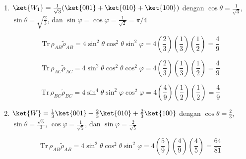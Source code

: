 \begin{enumerate}
	sehingga $\det c_{1BC}^0 = 0$
	
	\begin{equation}
		c_{0BC}^1=
		\begin{pmatrix}
			c_{100} & c_{101} \\
			c_{010} & c_{011}
		\end{pmatrix}=
		\begin{pmatrix}
			\cos\theta & 0 \\
			\sin\theta\sin\varphi & 0
		\end{pmatrix}
	\end{equation}
	
	sehingga $\det c_{0BC}^1 = 0$.
	
	Maka
	\begin{equation}
		\mathrm{Tr}\,\rho_{BC}\tilde{\rho}_{BC}=4\sin^4\theta \sin^2\varphi\cos^2\varphi
	\end{equation}
	
	\item {$\ket{W_1}=\frac{1}{\sqrt{3}}(\ket{001}+\ket{010}+\ket{100})$}
	dengan $\cos\theta=\frac{1}{\sqrt{3}}$, $\sin\theta=\sqrt{\frac{2}{3}}$, dan $\sin\varphi=\cos\varphi=\frac{1}{\sqrt{2}}=\pi/4$
	
	\begin{equation}
		\mathrm{Tr}\,\rho_{AB}\tilde{\rho}_{AB}=4\sin^2\theta \cos^2\theta \sin^2\varphi=4(\frac{2}{3})(\frac{1}{3})(\frac{1}{2})=\frac{4}{9}
	\end{equation}
	
	\begin{equation}
		\mathrm{Tr}\,\rho_{AC}\tilde{\rho}_{AC}=4\sin^2\theta \cos^2\theta \cos^2\varphi=4(\frac{2}{3})(\frac{1}{3})(\frac{1}{2})=\frac{4}{9}
	\end{equation}
	
	\begin{equation}
		\mathrm{Tr}\,\rho_{BC}\tilde{\rho}_{BC}=4\sin^4\theta \sin^2\varphi\cos^2\varphi=4(\frac{4}{9})(\frac{1}{2})(\frac{1}{2})=\frac{4}{9}
	\end{equation}
	
	\item {$\ket{W}=\frac{1}{3}\ket{001}+\frac{2}{3}\ket{010}+\frac{2}{3}\ket{100}$}
	dengan $\cos\theta=\frac{2}{3}$, $\sin\theta={\frac{\sqrt{5}}{3}}$, $\cos\varphi=\frac{1}{\sqrt{5}}$, dan $\sin\varphi=\frac{2}{\sqrt{5}}$
	
	\begin{equation}
		\mathrm{Tr}\,\rho_{AB}\tilde{\rho}_{AB}=4\sin^2\theta \cos^2\theta \sin^2\varphi=4(\frac{5}{9})(\frac{4}{9})(\frac{4}{5})=\frac{64}{81}
	\end{equation}
	

\end{enumerate}
